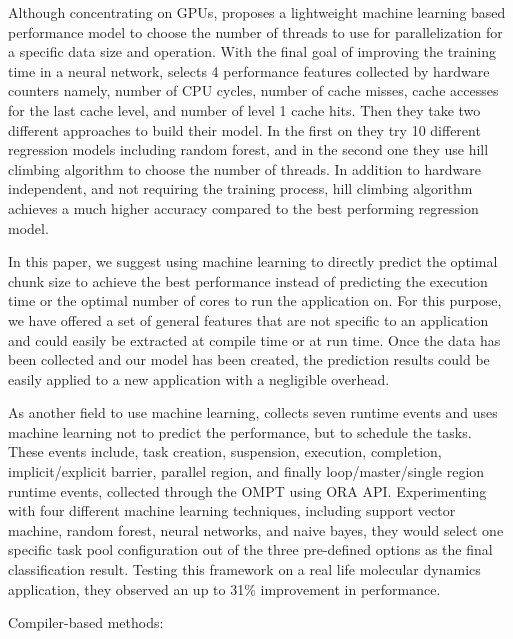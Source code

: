 	
\cite{pusukuri2011thread}
\cite{marin2004cross}


Although concentrating on GPUs,	\cite{liu2018runtime} proposes a lightweight machine learning based performance model to choose the number of threads to use for parallelization for a specific data size and operation. With the final goal of improving the training time in a neural network, \cite{liu2018runtime} selects 4 performance features collected by hardware counters namely, number of CPU cycles, number of cache misses, cache accesses for the last cache level, and number of level 1 cache hits. Then they take two different approaches to build their model. In the first on they try 10 different regression models including random forest, and in the second one they use hill climbing algorithm to choose the number of threads. In addition to hardware independent, and not requiring the training process, hill climbing algorithm achieves a much higher accuracy compared to the best performing regression model.

In this paper, we suggest using machine learning to directly predict the optimal chunk size to achieve the best performance instead of predicting the execution time or the optimal number of cores to run the application on. For this purpose, we have offered a set of general features that are not specific to an application and could easily be extracted at compile time or at run time. Once the data has been collected and our model has been created, the prediction results could be easily applied to a new application with a negligible overhead. 


\cite{sun2017automated}


	
As another field to use machine learning, \cite{qawasmeh2015adaptive} collects seven runtime events and uses machine learning not to predict the performance, but to schedule the tasks. These events include, task creation, suspension, execution, completion, implicit/explicit barrier, parallel region, and finally loop/master/single region runtime events, collected through the OMPT using ORA API. Experimenting with four different machine learning techniques, including support vector machine, random forest, neural networks, and naive bayes, they would select one specific task pool configuration out of the three pre-defined options as the final classification result. Testing this framework on a real life molecular dynamics application, they observed an up to 31\% improvement in performance. 


Compiler-based methods:

